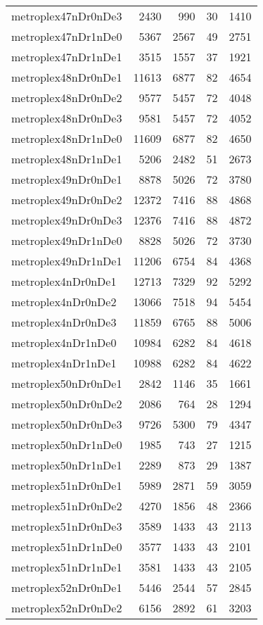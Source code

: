 \begin{longtable}{lrrrr}
metroplex47nDr0nDe3 & 2430 & 990 & 30 & 1410 \\
metroplex47nDr1nDe0 & 5367 & 2567 & 49 & 2751 \\
metroplex47nDr1nDe1 & 3515 & 1557 & 37 & 1921 \\
metroplex48nDr0nDe1 & 11613 & 6877 & 82 & 4654 \\
metroplex48nDr0nDe2 & 9577 & 5457 & 72 & 4048 \\
metroplex48nDr0nDe3 & 9581 & 5457 & 72 & 4052 \\
metroplex48nDr1nDe0 & 11609 & 6877 & 82 & 4650 \\
metroplex48nDr1nDe1 & 5206 & 2482 & 51 & 2673 \\
metroplex49nDr0nDe1 & 8878 & 5026 & 72 & 3780 \\
metroplex49nDr0nDe2 & 12372 & 7416 & 88 & 4868 \\
metroplex49nDr0nDe3 & 12376 & 7416 & 88 & 4872 \\
metroplex49nDr1nDe0 & 8828 & 5026 & 72 & 3730 \\
metroplex49nDr1nDe1 & 11206 & 6754 & 84 & 4368 \\
metroplex4nDr0nDe1 & 12713 & 7329 & 92 & 5292 \\
metroplex4nDr0nDe2 & 13066 & 7518 & 94 & 5454 \\
metroplex4nDr0nDe3 & 11859 & 6765 & 88 & 5006 \\
metroplex4nDr1nDe0 & 10984 & 6282 & 84 & 4618 \\
metroplex4nDr1nDe1 & 10988 & 6282 & 84 & 4622 \\
metroplex50nDr0nDe1 & 2842 & 1146 & 35 & 1661 \\
metroplex50nDr0nDe2 & 2086 & 764 & 28 & 1294 \\
metroplex50nDr0nDe3 & 9726 & 5300 & 79 & 4347 \\
metroplex50nDr1nDe0 & 1985 & 743 & 27 & 1215 \\
metroplex50nDr1nDe1 & 2289 & 873 & 29 & 1387 \\
metroplex51nDr0nDe1 & 5989 & 2871 & 59 & 3059 \\
metroplex51nDr0nDe2 & 4270 & 1856 & 48 & 2366 \\
metroplex51nDr0nDe3 & 3589 & 1433 & 43 & 2113 \\
metroplex51nDr1nDe0 & 3577 & 1433 & 43 & 2101 \\
metroplex51nDr1nDe1 & 3581 & 1433 & 43 & 2105 \\
metroplex52nDr0nDe1 & 5446 & 2544 & 57 & 2845 \\
metroplex52nDr0nDe2 & 6156 & 2892 & 61 & 3203 \\

\end{longtable}
